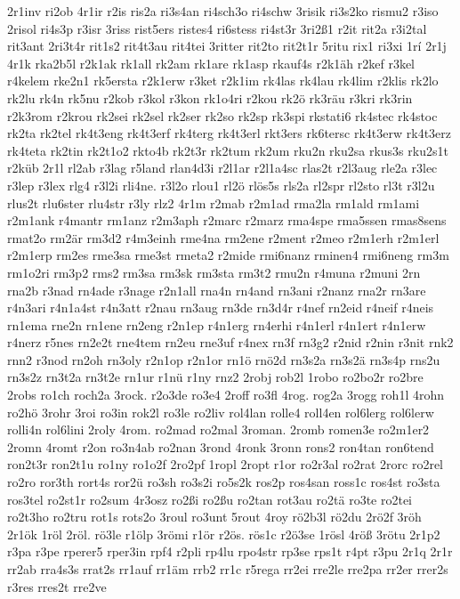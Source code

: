{2r1inv
ri2ob
4r1ir
r2is
ris2a
ri3s4an
ri4sch3o
ri4schw
3risik
ri3s2ko
rismu2
r3iso
2risol
ri4s3p
r3isr
3riss
rist5ers
ristes4
ri6stess
ri4st3r
3ri2ß1
r2it
rit2a
r3i2tal
rit3ant
2ri3t4r
rit1s2
rit4t3au
rit4tei
3ritter
rit2to
rit2t1r
5ritu
rix1
ri3xi
1rí
2r1j
4r1k
rka2b5l
r2k1ak
rk1all
rk2am
rk1are
rk1asp
rkauf4s
r2k1äh
r2kef
r3kel
r4kelem
rke2n1
rk5ersta
r2k1erw
r3ket
r2k1im
rk4las
rk4lau
rk4lim
r2klis
rk2lo
rk2lu
rk4n
rk5nu
r2kob
r3kol
r3kon
rk1o4ri
r2kou
rk2ö
rk3räu
r3kri
rk3rin
r2k3rom
r2krou
rk2sei
rk2sel
rk2ser
rk2so
rk2sp
rk3spi
rkstati6
rk4stec
rk4stoc
rk2ta
rk2tel
rk4t3eng
rk4t3erf
rk4terg
rk4t3erl
rkt3ers
rk6tersc
rk4t3erw
rk4t3erz
rk4teta
rk2tin
rk2t1o2
rkto4b
rk2t3r
rk2tum
rk2um
rku2n
rku2sa
rkus3s
rku2s1t
r2küb
2r1l
rl2ab
r3lag
r5land
rlan4d3i
r2l1ar
r2l1a4sc
rlas2t
r2l3aug
rle2a
r3lec
r3lep
r3lex
rlg4
r3l2i
rli4ne.
r3l2o
rlou1
rl2ö
rlös5s
rls2a
rl2spr
rl2sto
rl3t
r3l2u
rlus2t
rlu6ster
rlu4str
r3ly
rlz2
4r1m
r2mab
r2m1ad
rma2la
rm1ald
rm1ami
r2m1ank
r4mantr
rm1anz
r2m3aph
r2marc
r2marz
rma4spe
rma5ssen
rmas8sens
rmat2o
rm2är
rm3d2
r4m3einh
rme4na
rm2ene
r2ment
r2meo
r2m1erh
r2m1erl
r2m1erp
rm2es
rme3sa
rme3st
rmeta2
r2mide
rmi6nanz
rminen4
rmi6neng
rm3m
rm1o2ri
rm3p2
rms2
rm3sa
rm3sk
rm3sta
rm3t2
rmu2n
r4muna
r2muni
2rn
rna2b
r3nad
rn4ade
r3nage
r2n1all
rna4n
rn4and
rn3ani
r2nanz
rna2r
rn3are
r4n3ari
r4n1a4st
r4n3att
r2nau
rn3aug
rn3de
rn3d4r
r4nef
rn2eid
r4neif
r4neis
rn1ema
rne2n
rn1ene
rn2eng
r2n1ep
r4n1erg
rn4erhi
r4n1erl
r4n1ert
r4n1erw
r4nerz
r5nes
rn2e2t
rne4tem
rn2eu
rne3uf
r4nex
rn3f
rn3g2
r2nid
r2nin
r3nit
rnk2
rnn2
r3nod
rn2oh
rn3oly
r2n1op
r2n1or
rn1ö
rnö2d
rn3s2a
rn3s2ä
rn3s4p
rns2u
rn3s2z
rn3t2a
rn3t2e
rn1ur
r1nü
r1ny
rnz2
2robj
rob2l
1robo
ro2bo2r
ro2bre
2robs
ro1ch
roch2a
3rock.
r2o3de
ro3e4
2roff
ro3fl
4rog.
rog2a
3rogg
roh1l
4rohn
ro2hö
3rohr
3roi
ro3in
rok2l
ro3le
ro2liv
rol4lan
rolle4
roll4en
rol6lerg
rol6lerw
rolli4n
rol6lini
2roly
4rom.
ro2mad
ro2mal
3roman.
2romb
romen3e
ro2m1er2
2romn
4romt
r2on
ro3n4ab
ro2nan
3rond
4ronk
3ronn
rons2
ron4tan
ron6tend
ron2t3r
ron2t1u
ro1ny
ro1o2f
2ro2pf
1ropl
2ropt
r1or
ro2r3al
ro2rat
2rorc
ro2rel
ro2ro
ror3th
rort4s
ror2ü
ro3sh
ro3s2i
ro5s2k
ros2p
ros4san
ross1c
ros4st
ro3sta
ros3tel
ro2st1r
ro2sum
4r3osz
ro2ßi
ro2ßu
ro2tan
rot3au
ro2tä
ro3te
ro2tei
ro2t3ho
ro2tru
rot1s
rots2o
3roul
ro3unt
5rout
4roy
rö2b3l
rö2du
2rö2f
3röh
2r1ök
1röl
2röl.
rö3le
r1ölp
3römi
r1ör
r2ös.
rös1c
r2ö3se
1rösl
4röß
3rötu
2r1p2
r3pa
r3pe
rperer5
rper3in
rpf4
r2pli
rp4lu
rpo4str
rp3se
rps1t
r4pt
r3pu
2r1q
2r1r
rr2ab
rra4s3s
rrat2s
rr1auf
rr1äm
rrb2
rr1c
r5rega
rr2ei
rre2le
rre2pa
rr2er
rrer2s
r3res
rres2t
rre2ve
}
